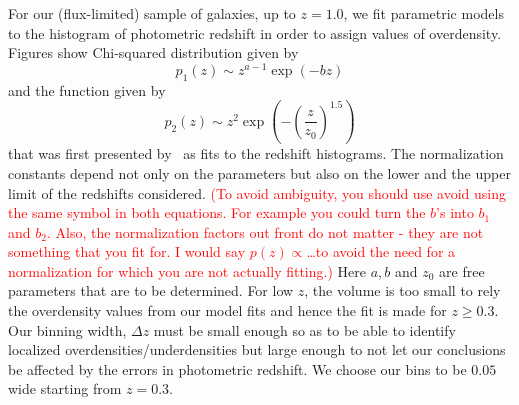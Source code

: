 \documentclass[twocolumn,useAMS,usenatbib]{mn2e}
\newcommand{\rachel}[1]{{\textcolor{red}{#1}}}
\begin{document}
For our (flux-limited) sample of galaxies, up to $z=1.0$, we fit parametric models to the histogram of photometric redshift in order to assign values of overdensity. Figures show Chi-squared distribution given by
\begin{equation}
 p_1(z) \sim z^{a-1}\exp({-bz})
\end{equation}
and the function given by
\begin{equation}
 p_2(z) \sim z^2\exp{\left(-\left(\frac{z}{z_0}\right)^{1.5}\right)}
\end{equation}
that was first presented by~\cite{Redshift_modelling} as fits to the
redshift histograms. The normalization constants depend not only on the parameters but also on the lower and the upper limit of the redshifts considered. \rachel{(To avoid ambiguity, you should use avoid
  using the same symbol in both equations.  For example you could turn
  the $b$'s into $b_1$ and $b_2$.  Also, the normalization factors out
  front do not matter - they are not something that you fit for.  I
  would say $p(z)\propto$\dots to avoid 
  the need for a normalization for which you are not actually fitting.)} Here $a,b$ and $z_0$ are free parameters that are to be determined.
For low $z$, the volume is too small to rely the overdensity values from our model fits and hence the fit is made for $z \ge 0.3$. Our binning width, $\Delta z$ must be small enough so as to be able to identify localized overdensities/underdensities but large enough to not let our conclusions be affected by the errors in photometric redshift. 
We choose our bins to be $0.05$ wide starting from $z=0.3$. 

\end{document}
